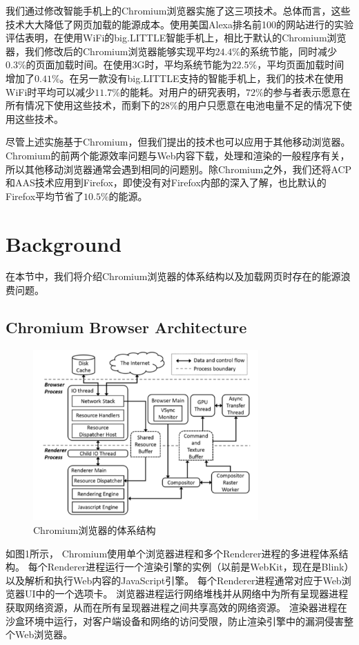 \documentclass[sigconf]{acmart}
\begin{document}
我们通过修改智能手机上的Chromium浏览器实施了这三项技术。总体而言，这些技术大大降低了网页加载的能源成本。使用美国Alexa排名前100的网站\cite{2}进行的实验评估表明，在使用WiFi的big.LITTLE智能手机上，相比于默认的Chromium浏览器，我们修改后的Chromium浏览器能够实现平均$24.4\%$的系统节能，同时减少$0.3\%$的页面加载时间。在使用3G时，平均系统节能为$22.5\%$，平均页面加载时间增加了$0.41\%$。在另一款没有big.LITTLE支持的智能手机上，我们的技术在使用WiFi时平均可以减少$11.7\%$的能耗。对用户的研究表明，$72\%$的参与者表示愿意在所有情况下使用这些技术，而剩下的$28\%$的用户只愿意在电池电量不足的情况下使用这些技术。

尽管上述实施基于Chromium，但我们提出的技术也可以应用于其他移动浏览器。 Chromium的前两个能源效率问题与Web内容下载，处理和渲染的一般程序有关，所以其他移动浏览器通常会遇到相同的问题别。除Chromium之外，我们还将ACP和AAS技术应用到Firefox，即使没有对Firefox内部的深入了解，也比默认的Firefox平均节省了$10.5\%$的能源。

\section{Background} 

在本节中，我们将介绍Chromium浏览器的体系结构以及加载网页时存在的能源浪费问题。

\subsection{Chromium Browser Architecture}

\begin{figure}[htbp]
	\centering
	\includegraphics[width=3.4in]{./figure/figure1}
	\caption{Chromium浏览器的体系结构}\label{fig:tasks}
\end{figure}

如图1所示， Chromium使用单个浏览器进程和多个Renderer进程的多进程体系结构。 每个Renderer进程运行一个渲染引擎的实例（以前是WebKit\cite{14}，现在是Blink\cite{4}）以及解析和执行Web内容的JavaScript引擎。 每个Renderer进程通常对应于Web浏览器UI中的一个选项卡。 浏览器进程运行网络堆栈并从网络中为所有呈现器进程获取网络资源，从而在所有呈现器进程之间共享高效的网络资源。 渲染器进程在沙盒环境中运行，对客户端设备和网络的访问受限，防止渲染引擎中的漏洞侵害整个Web浏览器。
\end{document}
